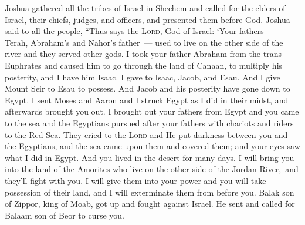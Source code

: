 
\begin{inparaenum}
     Joshua gathered all the tribes of Israel in Shechem and called for the elders of Israel, their chiefs, judges, and officers, and presented them before God.%
     Joshua said to all the people, ``Thus says the \textsc{Lord}, God of Israel: `Your fathers~--- Terah, Abraham's and Nahor's father~--- used to live on the other side of the river and they served other gods.%
     I took your father Abraham from the trans-Euphrates and caused him to go through the land of Canaan, to multiply his posterity, and I have him Isaac.%
     I gave to Isaac, Jacob, and Esau. And I give Mount Seir to Esau to possess. And Jacob and his posterity have gone down to Egypt.%
     I sent Moses and Aaron and I struck Egypt as I did in their midst, and afterwards brought you out.%
     I brought out your fathers from Egypt and you came to the sea and the Egyptians pursued after your fathers with chariots and riders to the Red Sea.%
     They cried to the \textsc{Lord} and He put darkness between you and the Egyptians, and the sea came upon them and covered them; and your eyes saw what I did in Egypt. And you lived in the desert for many days.%
     I will bring you into the land of the Amorites who live on the other side of the Jordan River,\understood\ and they'll fight with you. I will give them into your power and you will take possession of their land, and I will exterminate them from before you.%
     Balak son of Zippor, king of Moab, got up and fought against Israel. He sent and called for Balaam son of Beor to curse you.%

\end{inparaenum}
